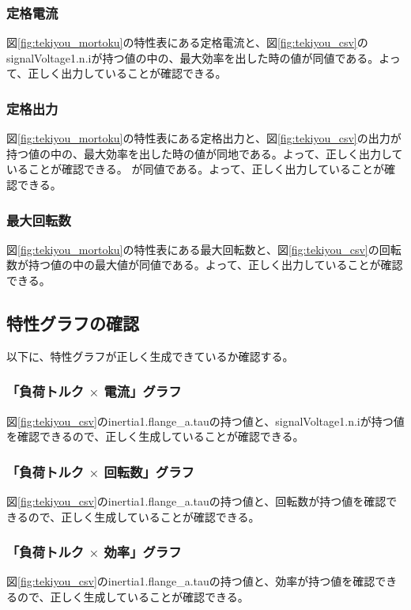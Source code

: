 \subsubsection{定格電流}
図\ref{fig:tekiyou_mortoku}の特性表にある定格電流と、図\ref{fig:tekiyou_csv}のsignalVoltage1.n.iが持つ値の中の、最大効率を出した時の値が同値である。よって、正しく出力していることが確認できる。
\subsubsection{定格出力}
図\ref{fig:tekiyou_mortoku}の特性表にある定格出力と、図\ref{fig:tekiyou_csv}の出力が持つ値の中の、最大効率を出した時の値が同地である。よって、正しく出力していることが確認できる。
が同値である。よって、正しく出力していることが確認できる。
\subsubsection{最大回転数}
図\ref{fig:tekiyou_mortoku}の特性表にある最大回転数と、図\ref{fig:tekiyou_csv}の回転数が持つ値の中の最大値が同値である。よって、正しく出力していることが確認できる。
\subsection{特性グラフの確認}
以下に、特性グラフが正しく生成できているか確認する。

\subsubsection{「負荷トルク $\times$ 電流」グラフ}
図\ref{fig:tekiyou_csv}のinertia1.flange\_a.tauの持つ値と、signalVoltage1.n.iが持つ値を確認できるので、正しく生成していることが確認できる。
\subsubsection{「負荷トルク $\times$ 回転数」グラフ}
図\ref{fig:tekiyou_csv}のinertia1.flange\_a.tauの持つ値と、回転数が持つ値を確認できるので、正しく生成していることが確認できる。
\subsubsection{「負荷トルク $\times$ 効率」グラフ}
図\ref{fig:tekiyou_csv}のinertia1.flange\_a.tauの持つ値と、効率が持つ値を確認できるので、正しく生成していることが確認できる。
